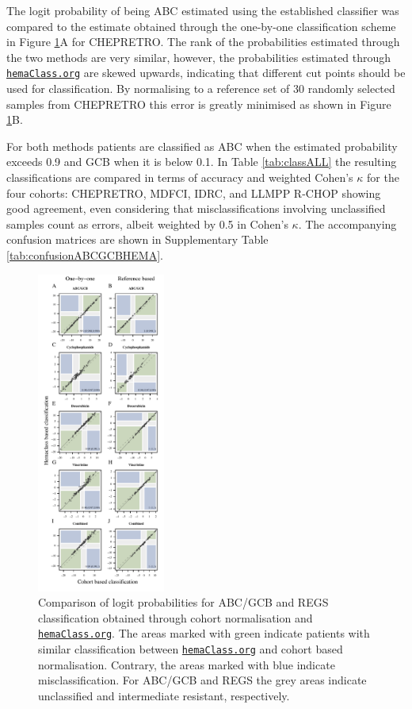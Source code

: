 \documentclass{article}
\newcommand{\hemaClass}{\href{http://hemaClass.org}{\texttt{hemaClass.org}}}
\begin{document}
The logit probability of being ABC estimated using the established classifier was compared to the estimate obtained through the one-by-one classification scheme in Figure \ref{fig:ABCGCBDrug}A for CHEPRETRO.
The rank of the probabilities estimated through the two methods are very similar, however, the probabilities estimated through \hemaClass{} are skewed upwards, indicating that different cut points should be used for classification.
By normalising to a reference set of 30 randomly selected samples from CHEPRETRO this error is greatly minimised as shown in Figure \ref{fig:ABCGCBDrug}B.

For both methods patients are classified as ABC when the estimated probability exceeds 0.9 and GCB when it is below 0.1.
In Table \ref{tab:classALL} the resulting classifications are compared in terms of accuracy and weighted Cohen's $\kappa$ for the four cohorts: CHEPRETRO, MDFCI, IDRC, and LLMPP R-CHOP showing good agreement, even considering that misclassifications involving unclassified samples count as errors, albeit weighted by 0.5 in Cohen's $\kappa$.
The accompanying confusion matrices are shown in Supplementary Table \ref{tab:confusionABCGCBHEMA}.



\begin{figure}
\begin{center}
\includegraphics[width=0.375\textwidth]{figures/DruglogitChep.pdf}
\end{center}
\caption{Comparison of logit probabilities for ABC/GCB and REGS classification obtained through cohort normalisation and \hemaClass{}.
The areas marked with green indicate patients with similar classification between \hemaClass{} and cohort based normalisation.
Contrary, the areas marked with blue indicate misclassification.
For ABC/GCB and REGS the grey areas indicate unclassified and intermediate resistant, respectively.}
\label{fig:ABCGCBDrug}
\end{figure}
\end{document}
